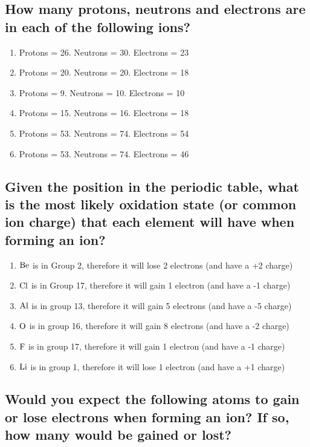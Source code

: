 \documentclass[11pt]{article}
\begin{document}
\subsection{How many protons, neutrons and electrons are in each of the following ions?}
\label{sec:orga9fe8a4}
\begin{enumerate}
\item Protons = 26. Neutrons = 30. Electrons = 23
\item Protons = 20. Neutrons = 20. Electrons = 18
\item Protons = 9. Neutrons = 10. Electrons = 10
\item Protons = 15. Neutrons = 16. Electrons = 18
\item Protons = 53. Neutrons = 74. Electrons = 54
\item Protons = 53. Neutrons = 74. Electrons = 46
\end{enumerate}

\subsection{Given the position in the periodic table, what is the most likely oxidation state (or common ion charge) that each element will have when forming an ion?}
\label{sec:orgb624440}
\begin{enumerate}
\item \(\ce{Be}\) is in Group 2, therefore it will lose 2 electrons (and have a +2 charge)
\item \(\ce{Cl}\) is in Group 17, therefore it will gain 1 electron (and have a -1 charge)
\item \(\ce{Al}\) is in group 13, therefore it will gain 5 electrons (and have a -5 charge)
\item \(\ce{O}\) is in group 16, therefore it will gain 8 electrons (and have a -2 charge)
\item \(\ce{F}\) is in group 17, therefore it will gain 1 electron (and have a -1 charge)
\item \(\ce{Li}\) is in group 1, therefore it will lose 1 electron (and have a +1 charge)
\end{enumerate}

\subsection{Would you expect the following atoms to gain or lose electrons when forming an ion? If so, how many would be gained or lost?}
\label{sec:org73a6150}
\end{document}
